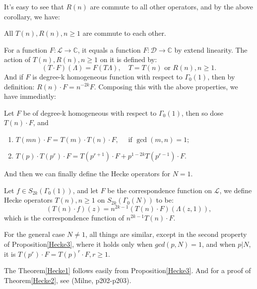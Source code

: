     It's easy to see that $R(n)$ are commute to all other  operators, and by the above corollary, we have:

    \begin{corollary}
        All $T(n),R(n),n\geq 1$ are commute to each other.
    \end{corollary}

    For a function $F:\mathcal{L}\to \mathbb{C}$, it equals a function $F:\mathcal{D}\to \mathbb{C}$ by extend linearity. The action of $T(n),R(n),n\geq 1$ on it is defined by:
    $$(T\cdot F)(\Lambda)=F(T\Lambda),\quad T=T(n) \text{ or } R(n),n\geq 1.$$
    And if $F$ is degree-k homogeneous function with respect to $\Gamma_0(1)$, then by definition: $R(n)\cdot F=n^{-2k}F$. Composing this with the above properties, we have immediatly:

    \begin{proposition}\label{Hecke3}
        Let $F$ be of degree-k homogeneous with respect to $\Gamma_0(1)$, then so dose $T(n)\cdot F$, and 
        \begin{enumerate}
            \item $T(m n)\cdot F  =T(m)\cdot  T(n)\cdot F, \quad \text { if } \operatorname{gcd}(m, n)=1 ;$
            \item $T(p) \cdot T\left(p^{r}\right) \cdot F =T\left(p^{r+1}\right) \cdot F+p^{1-2k} T\left(p^{r-1}\right)\cdot F.$
        \end{enumerate}
    \end{proposition}

    And then we can finally define the Hecke operators for $N=1$.

    \begin{definition}
        Let $f\in S_{2k}(\Gamma_0(1))$, and let $F$ be the correspondence function on $\mathcal{L}$, we define Hecke operators $T(n),n\geq 1$ on $S_{2k}(\Gamma_0(N))$ to be:
        $$(T(n)\cdot f)(z)=n^{2k-1}(T(n)\cdot F)(\Lambda(z,1)),$$
        which is the correspondence function of $n^{2k-1} T(n)\cdot F$.
    \end{definition}

    For the general case $N\neq 1$, all things are similar, except in the second property of Proposition\ref{Hecke3}, where it holds only when $gcd(p,N)=1$, and when $p|N$, it is $T(p^r)\cdot F=T(p)^r \cdot F, r\geq 1$.

    The Theorem\ref{Hecke1} follows easily from Proposition\ref{Hecke3}. And for a proof of Theorem\ref{Hecke2}, see (Milne, p202-p203).

